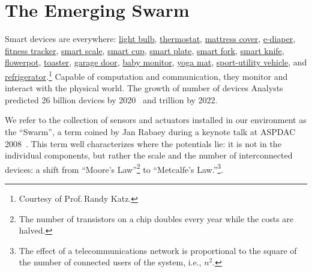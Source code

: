 \section{The Emerging Swarm}
\label{sec:emerging-swarm}

Smart devices are everywhere: \href{http://ilumi.co/}{light bulb},
\href{https://nest.com/}{thermostat}, \href{http://lunasleep.com/}{mattress
  cover}, \href{https://www.indiegogo.com/projects/smart-diapers}{e-diaper},
\href{https://www.fitbit.com/}{fitness tracker},
\href{https://www.fitbit.com/aria}{smart scale},
\href{https://www.myvessyl.com/}{smart cup},
\href{https://www.kickstarter.com/projects/1816678675/smartplate-instantly-track-and-analyze-everything}{smart
  plate},
\href{http://www.amazon.com/HAPILABS-102-HAPIfork-Bluetooth-Enabled-Smart/dp/B00FRPCPEC}{smart
  fork}, \href{http://electroluxdesignlab.com/en/submission/smart-knife/}{smart
  knife},
\href{http://www.clickandgrow.com/pages/what-is-click-grow}{flowerpot},
\href{http://www.williams-sonoma.com/products/breville-die-cast-2-slice-stainless-steel-smart-toaster/}{toaster},
\href{https://garageio.com/}{garage door},
\href{http://www2.withings.com/us/en/products/baby/smart-baby-monitor}{baby
  monitor},
\href{https://www.indiegogo.com/projects/smartmat-the-world-s-first-intelligent-yoga-mat}{yoga
  mat},
\href{http://usnews.rankingsandreviews.com/cars-trucks/best-cars-blog/2013/02/2015_GM_Vehicles_Will_Get_Wi-Fi_Internet_Access/}{sport-utility
  vehicle}, and
\href{http://www.samsung.com/us/appliances/refrigerators/RF28HMELBSR/AA}{refrigerator}.\footnote{Courtesy
  of Prof.\,Randy Katz.} Capable of computation and communication, they monitor
and interact with the physical world.  The growth of number of devices Analysts
predicted 26 billion devices by 2020~\cite{middleton2013forecast} and trillion
by 2022.
 

We refer to the collection of sensors and actuators installed in our environment
as the ``Swarm'', a term coined by Jan Rabaey during a keynote talk at ASPDAC
2008~\cite{rabaey2008brand}. This term well characterizes where the potentials
lie: it is not in the individual components, but rather the scale and the number
of interconnected devices: a shift from ``Moore's Law''\footnote{The number of
  transistors on a chip doubles every year while the costs are halved.} to
``Metcalfe's Law.''\footnote{The effect of a telecommunications network is
  proportional to the square of the number of connected users of the system,
  i.e., $n^2$.}.

